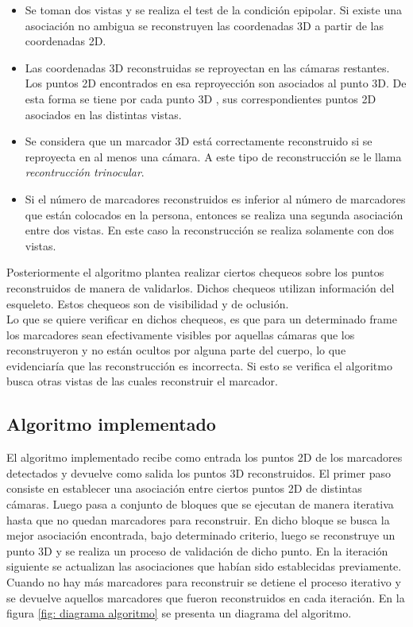 \begin{itemize}
\item Se toman dos vistas y se realiza el test de la condición epipolar. Si existe una asociación no ambigua se reconstruyen  las coordenadas 3D a partir de las coordenadas 2D.

\item Las coordenadas 3D reconstruidas se reproyectan en las cámaras restantes. Los puntos 2D encontrados en esa reproyección son asociados al punto 3D. De esta forma se tiene por cada punto 3D , sus correspondientes puntos 2D asociados en las distintas vistas.\

\item Se considera que un marcador 3D está correctamente reconstruido si se reproyecta en al menos una cámara. A este tipo de reconstrucción se le llama \textit{recontrucción trinocular}.\\

\item Si el número de marcadores reconstruidos es inferior al número de marcadores que están colocados en la persona, entonces se realiza una segunda asociación entre dos vistas. En este caso la reconstrucción se realiza solamente con dos vistas.\\

\end{itemize}

Posteriormente el algoritmo plantea realizar ciertos chequeos sobre los puntos reconstruidos de manera de validarlos. Dichos chequeos utilizan información del esqueleto. Estos chequeos son de visibilidad y de oclusión.\\

Lo que se quiere verificar en dichos chequeos, es que para un determinado frame los marcadores sean efectivamente visibles por aquellas cámaras que los reconstruyeron y no están ocultos por alguna parte del cuerpo, lo que evidenciaría que las reconstrucción es incorrecta. Si esto se verifica el algoritmo busca otras vistas de las cuales reconstruir el marcador.\\

\subsection{Algoritmo implementado}

El algoritmo implementado recibe como entrada los puntos 2D de los marcadores detectados y devuelve como salida los puntos 3D reconstruidos. El primer paso consiste en establecer una asociación entre ciertos puntos 2D de distintas cámaras. Luego pasa a conjunto de bloques que se ejecutan de manera iterativa hasta que no quedan marcadores para reconstruir. En dicho bloque se busca la mejor asociación encontrada, bajo determinado criterio, luego se reconstruye un punto 3D y se realiza un proceso de validación de dicho punto. En la iteración siguiente se actualizan las asociaciones que habían sido establecidas previamente. Cuando no hay más marcadores para reconstruir se detiene el proceso iterativo y se devuelve aquellos marcadores que fueron reconstruidos en cada iteración. En la figura \ref{fig: diagrama algoritmo} se presenta un diagrama del algoritmo.\\

